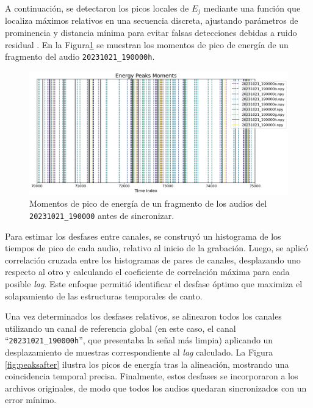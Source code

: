 A continuación, se detectaron los picos locales de \(E_j\) 
mediante una función que localiza 
máximos relativos en una secuencia discreta, ajustando 
parámetros de prominencia y distancia mínima para evitar falsas 
detecciones debidas a ruido residual \cite{scipy-signal}. 
En la Figura\ref{fig:peaks} se muestran los momentos de pico de 
energía de un fragmento del audio \texttt{20231021\_190000h}.

\begin{figure}[ht]
    \centering
    \includegraphics[width=0.9\linewidth]{Graphics/peaks_before.png}
    \caption{Momentos de pico de energía de un fragmento de los audios del \texttt{20231021\_190000} antes de sincronizar.}
    \label{fig:peaks}
  \end{figure}

Para estimar los desfases entre canales, se construyó un 
histograma de los tiempos de pico de cada audio, relativo al 
inicio de la grabación. Luego, se aplicó correlación cruzada \cite{costa2021comparing} 
entre los histogramas de pares de canales, desplazando uno 
respecto al otro y calculando el coeficiente de correlación 
máxima para cada posible \emph{lag}. 
Este enfoque permitió identificar el desfase 
óptimo que maximiza el solapamiento de las estructuras 
temporales de canto.

Una vez determinados los desfases relativos, se alinearon todos 
los canales utilizando un canal de referencia global (en este caso, el canal 
“\texttt{20231021\_190000h}”, que presentaba la señal más limpia) aplicando un 
desplazamiento de muestras correspondiente al \emph{lag} 
calculado. La Figura \ref{fig:peaksafter} ilustra los picos de 
energía tras la alineación, mostrando una coincidencia temporal 
precisa. Finalmente, estos desfases se incorporaron a 
los archivos originales, de modo que todos los 
audios quedaran sincronizados con un error mínimo.


